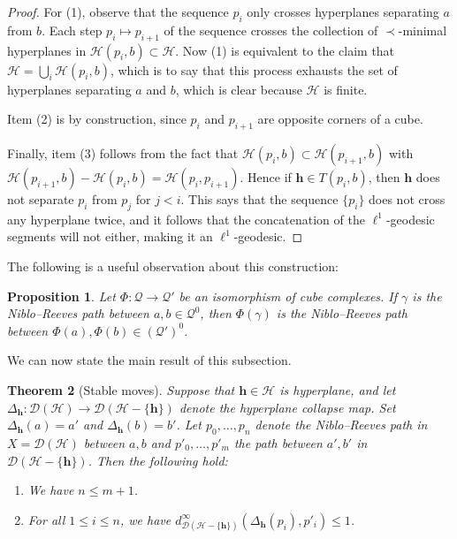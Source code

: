 \documentclass{amsart}
\newtheorem{theorem}{Theorem}[section]
\newtheorem{proposition}[theorem]{Proposition}
\theoremstyle{definition}
\theoremstyle{remark}
\theoremstyle{definition}
\newcommand{\hh}{{\sf h}}
\newcommand{\calD}{\mathcal{D}}
\newcommand{\calH}{\mathcal{H}}
\newcommand{\calQ}{\mathcal{Q}}
\renewcommand{\hh}{\mathbf{h}}
\begin{document}
\begin{proof}
For (1), observe that the sequence $p_i$ only crosses hyperplanes separating $a$ from $b$.  Each step $p_i \mapsto p_{i+1}$ of the sequence crosses the collection of $\prec$-minimal hyperplanes in $\calH(p_i, b)\subset \calH$.  Now (1) is equivalent to the claim that $\calH = \bigcup_i \calH(p_i,b)$, which is to say that this process exhausts the set of hyperplanes separating $a$ and $b$, which is clear because $\calH$ is finite.

Item (2) is by construction, since $p_i$ and $p_{i+1}$ are opposite corners of a cube.

Finally, item (3) follows from the fact that $\calH(p_i, b) \subset \calH(p_{i+1},b)$ with $\calH(p_{i+1},b) - \calH(p_i, b) = \calH(p_i,p_{i+1})$.  Hence if $\hh \in T(p_i,b)$, then $\hh$ does not separate $p_i$ from $p_j$ for $j<i$.  This says that the sequence $\{p_i\}$ does not cross any hyperplane twice, and it follows that the concatenation of the $\ell^1$-geodesic segments will not either, making it an $\ell^1$-geodesic.
\end{proof}

The following is a useful observation about this construction:

\begin{proposition}\label{prop:NR iso}
Let $\Phi:\calQ \to \calQ'$ be an isomorphism of cube complexes.  If $\gamma$ is the Niblo--Reeves path between $a,b \in \calQ^0$, then $\Phi(\gamma)$ is the Niblo--Reeves path between $\Phi(a), \Phi(b) \in \left(\calQ'\right)^{0}$.
\end{proposition}

We can now state the main result of this subsection.

\begin{theorem}[Stable moves]\label{thm:stable moves}
Suppose that $\hh \in \calH$ is hyperplane, and let $\Delta_{\hh}:\calD(\calH) \to \calD(\calH - \{\hh\})$ denote the hyperplane collapse map.  Set $\Delta_{\hh}(a) = a'$ and $\Delta_{\hh}(b) =b'$.  Let $p_0,\dots,p_n$ denote the Niblo--Reeves path in $X = \calD(\calH)$  between $a,b$ and $p'_0, \dots, p'_m$ the path between $a',b'$ in $\calD(\calH- \{\hh\})$.  Then the following hold:
\begin{enumerate}
\item We have $n \leq m+1$.
\item For all $1 \leq i \leq n$, we have $d^{\infty}_{\calD(\calH - \{\hh\})}(\Delta_{\hh}(p_i), p'_i) \leq 1$.
\end{enumerate}
\end{theorem}
\end{document}
